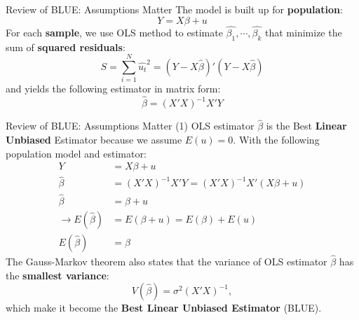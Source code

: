\documentclass[aspectratio=169, t]{beamer}
\begin{document}
\begin{frame}{Review of BLUE: Assumptions Matter}
    The model is built up for \textbf{population}:
    \begin{equation*}
        Y = X \beta + u 
    \end{equation*}
    For each \textbf{sample}, we use OLS method to estimate $\hat{\beta_1}, \cdots, \hat{\beta_k}$
    that minimize the sum of \textbf{squared residuals}:
    \begin{equation*}
        S = \sum_{i=1}^N \hat{u_t}^2 = (Y-X\hat{\beta})'(Y-X\hat{\beta})
    \end{equation*}
    and yields the following estimator in matrix form:
    \begin{equation}
        \hat{\beta} = (X'X)^{-1}X'Y 
    \end{equation}
\end{frame}

\begin{frame}{Review of BLUE: Assumptions Matter (1)}
    OLS estimator $\hat{\beta}$ is the Best \textbf{Linear Unbiased} Estimator
    because we assume $E(u) = 0$. With the following population model and estimator:
    \begin{align*}
        Y & = X\beta + u \\ 
        \hat{\beta} & = (X'X)^{-1}X'Y = (X'X)^{-1} X'(X\beta + u) \\ 
        \hat{\beta} & = \beta + u \\ 
        \to E(\hat{\beta})       & = E(\beta + u) = E(\beta) + E(u)  \\
        E(\hat{\beta})  & = \beta 
    \end{align*}
    The Gauss-Markov theorem also states that the variance of OLS estimator $\hat{\beta}$
    has the \textbf{smallest variance}:
    \begin{equation*}
        V(\hat{\beta}) = \sigma^2(X'X)^{-1},
    \end{equation*}
    which make it become the \textbf{Best Linear Unbiased Estimator} (BLUE).
\end{frame}
\end{document}
